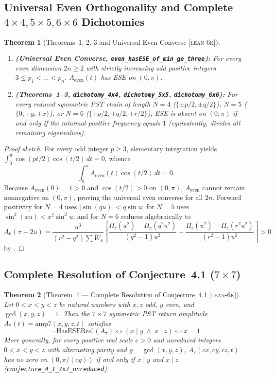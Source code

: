 \documentclass[11pt,reqno]{amsart}
\newtheorem{theorem}{Theorem}[section]
\theoremstyle{definition}
\newcommand{\taglean}{\textsc{[lean-6k]}}
\newcommand{\id}[1]{\textnormal{\texttt{\small #1}}}
\begin{document}
\subsection{Universal Even Orthogonality and Complete \texorpdfstring{$4\times 4, 5\times 5, 6\times 6$}{4x4, 5x5, 6x6} Dichotomies}

\begin{theorem}[Theorems~1, 2, 3 and Universal Even Converse \taglean{}]
\label{thm:456}
\leavevmode
\begin{enumerate}
\item \textbf{(Universal Even Converse, \id{even\_hasESE\_of\_min\_ge\_three}):} For \emph{every} even dimension $2n\ge 2$ with strictly increasing odd positive integers $3\le p_1<\dots<p_n$, $A_{\mathrm{even}}(t)$ has ESE on $(0,\pi)$.
\item \textbf{(Theorems~1--3, \id{dichotomy\_4x4}, \id{dichotomy\_5x5}, \id{dichotomy\_6x6}):} For every reduced symmetric PST chain of length $N=4$ ($\{\pm p/2,\pm q/2\}$), $N=5$ ($\{0,\pm y,\pm x\}$), or $N=6$ ($\{\pm p/2,\pm q/2,\pm r/2\}$), ESE is absent on $(0,\pi)$ if and only if the minimal positive frequency equals $1$ (equivalently, divides all remaining eigenvalues).
\end{enumerate}
\end{theorem}

\begin{proof}[Proof sketch]
For every odd integer $p\ge 3$, elementary integration yields $\int_0^\pi \cos(pt/2)\cos(t/2)\,dt=0$, whence
\[
\int_0^\pi A_{\mathrm{even}}(t)\cos(t/2)\,dt = 0.
\]
Because $A_{\mathrm{even}}(0)=1>0$ and $\cos(t/2)>0$ on $(0,\pi)$, $A_{\mathrm{even}}$ cannot remain nonnegative on $(0,\pi)$, proving the universal even converse for all $2n$. Forward positivity for $N=4$ uses $|\sin(qu)|<q\sin u$; for $N=5$ uses $\sin^2(xu)<x^2\sin^2 u$; and for $N=6$ reduces algebraically to
\[
A_6(\pi-2u) = \frac{u^3}{(r^2-q^2)\sum \widetilde{W}_k}\left[\frac{H_e(u^2)-H_e(q^2u^2)}{(q^2-1)u^2} - \frac{H_e(u^2)-H_e(r^2u^2)}{(r^2-1)u^2}\right] > 0
\]
by .
\end{proof}

\subsection{Complete Resolution of Conjecture~4.1 (\texorpdfstring{$7\times 7$}{7x7})}

\begin{theorem}[Theorem~4 --- Complete Resolution of Conjecture~4.1 \taglean{}]
\label{thm:conj41}
Let $0<x<y<z$ be natural numbers with $x,z$ odd, $y$ even, and $\gcd(x,y,z)=1$. Then the $7\times 7$ symmetric PST return amplitude $A_7(t)=\mathrm{amp7}(x,y,z,t)$ satisfies
\[
\neg\,\mathrm{HasESEReal}(A_7) \iff (x\mid y \;\wedge\; x\mid z) \iff x=1.
\]
More generally, for every positive real scale $c>0$ and unreduced integers $0<x<y<z$ with alternating parity and $g=\gcd(x,y,z)$, $A_7(cx,cy,cz,t)$ has no zero on $(0,\pi/(cg))$ if and only if $x\mid y$ and $x\mid z$ (\id{conjecture\_4\_1\_7x7\_unreduced}).
\end{theorem}
\end{document}
